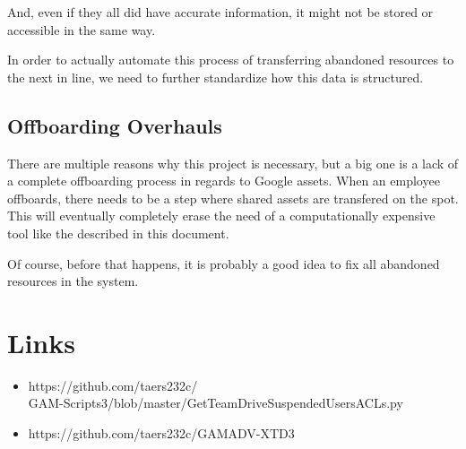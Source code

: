 \documentclass{article}
\begin{document}
And, even if they all did have accurate information, it might not be stored or accessible in the same way.

In order to actually automate this process of transferring abandoned resources to the next in line,
we need to further standardize how this data is structured.

\subsection*{Offboarding Overhauls}
There are multiple reasons why this project is necessary, but a big one is a lack of a complete offboarding process
in regards to Google assets. When an employee offboards, there needs to be a step where shared assets are transfered on the spot.
This will eventually completely erase the need of a computationally expensive tool like the described in this document.

Of course, before that happens, it is probably a good idea to fix all abandoned resources in the system.

\newpage
\section{Links}
\begin{itemize}
    \item https://github.com/taers232c/\\GAM-Scripts3/blob/master/GetTeamDriveSuspendedUsersACLs.py
    \item https://github.com/taers232c/GAMADV-XTD3
\end{itemize}
\end{document}

